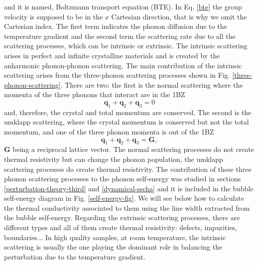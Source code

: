 and it is named, Boltzmann transport equation (BTE). In Eq. \ref{bte} the group velocity is supposed to be in the $x$ Cartesian direction, that is why we omit the Cartesian index. The first term indicates the phonon diffusion due to the temperature gradient and the second term the scattering rate due to all the scattering 
processes, which can be intrinsic or extrinsic. The intrinsic scattering arises in perfect and infinite crystalline materials and is created by the anharmonic phonon-phonon scattering. The main contribution of 
the intrinsic scattering arises from the three-phonon scattering processes shown in Fig. 
\ref{three-phonon-scattering}. There are two: the first is the normal scattering where the momenta of the three 
phonons that interact are in the 1BZ
\begin{equation}
\mathbf{q}_{1}+\mathbf{q}_{2}+\mathbf{q}_{3}=0
\end{equation} 
and, therefore, the crystal and total momentum are conserved. The second is the umklapp scattering, where the crystal momentum is conserved but not the total momentum, and one of the three phonon momenta is out of the 1BZ
\begin{equation}
\mathbf{q}_{1}+\mathbf{q}_{2}+\mathbf{q}_{3}=\mathbf{G},
\end{equation}
$\mathbf{G}$ being a reciprocal lattice vector. The normal scattering processes do not create thermal resistivity but can change the phonon population\cite{callaway1959model,tritt2005thermal}, the umklapp scattering 
processes do create thermal resistivity. The contribution of these three phonon scattering processes to the phonon self-energy was studied in sections \ref{perturbation-theory-third} and \ref{dynamical-sscha} and it is 
included in the bubble self-energy diagram in Fig. \ref{self-energy-fig}. We will see below how to calculate the thermal conductivity associated to them using the line width extracted from the bubble self-energy. Regarding the 
extrinsic scattering processes, there are different types and all of them create thermal resistivity: defects, impurities, boundaries$\dots$ In high quality samples, at room temperature, the intrinsic scattering is usually the 
one playing the dominant role in balancing the perturbation due to the temperature gradient. \\

